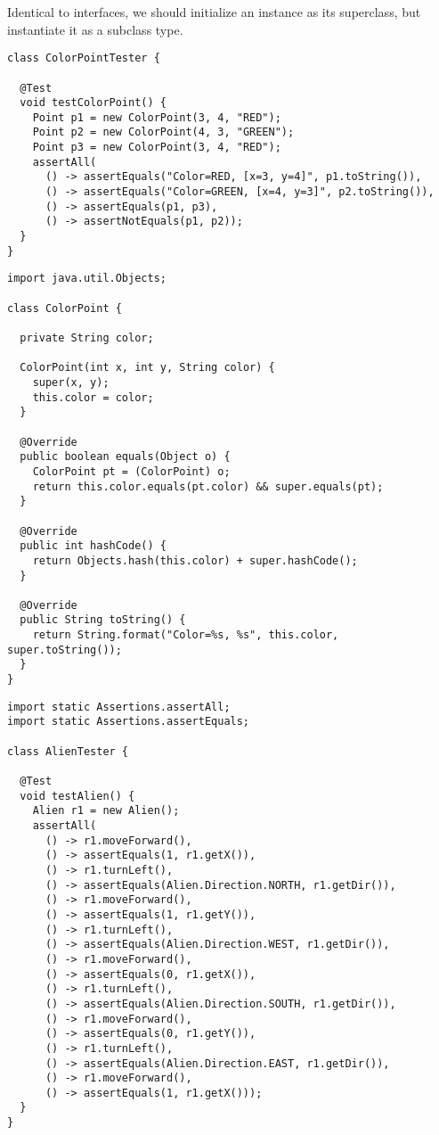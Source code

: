 Identical to interfaces, we should initialize an instance as its superclass, but instantiate it as a subclass type.

\begin{lstlisting}[language=MyJava]
class ColorPointTester {

  @Test
  void testColorPoint() {
    Point p1 = new ColorPoint(3, 4, "RED");
    Point p2 = new ColorPoint(4, 3, "GREEN");
    Point p3 = new ColorPoint(3, 4, "RED");
    assertAll(
      () -> assertEquals("Color=RED, [x=3, y=4]", p1.toString()),
      () -> assertEquals("Color=GREEN, [x=4, y=3]", p2.toString()),
      () -> assertEquals(p1, p3),
      () -> assertNotEquals(p1, p2));
  }
}
\end{lstlisting}

\begin{lstlisting}[language=MyJava]
import java.util.Objects;

class ColorPoint {

  private String color;

  ColorPoint(int x, int y, String color) {
    super(x, y);
    this.color = color;
  }

  @Override
  public boolean equals(Object o) {
    ColorPoint pt = (ColorPoint) o;
    return this.color.equals(pt.color) && super.equals(pt);
  }

  @Override
  public int hashCode() {
    return Objects.hash(this.color) + super.hashCode();
  }

  @Override
  public String toString() {
    return String.format("Color=%s, %s", this.color, super.toString());
  }
}
\end{lstlisting}


\begin{lstlisting}[language=MyJava]
import static Assertions.assertAll;
import static Assertions.assertEquals;

class AlienTester {

  @Test
  void testAlien() {
    Alien r1 = new Alien();
    assertAll(
      () -> r1.moveForward(),
      () -> assertEquals(1, r1.getX()),
      () -> r1.turnLeft(),
      () -> assertEquals(Alien.Direction.NORTH, r1.getDir()),
      () -> r1.moveForward(),
      () -> assertEquals(1, r1.getY()),
      () -> r1.turnLeft(),
      () -> assertEquals(Alien.Direction.WEST, r1.getDir()),
      () -> r1.moveForward(),
      () -> assertEquals(0, r1.getX()),
      () -> r1.turnLeft(),
      () -> assertEquals(Alien.Direction.SOUTH, r1.getDir()),
      () -> r1.moveForward(),
      () -> assertEquals(0, r1.getY()),
      () -> r1.turnLeft(),
      () -> assertEquals(Alien.Direction.EAST, r1.getDir()),
      () -> r1.moveForward(),
      () -> assertEquals(1, r1.getX()));
  }
}
\end{lstlisting}

